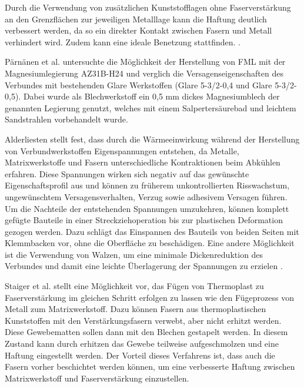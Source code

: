  

Durch die Verwendung von zusätzlichen Kunststofflagen ohne Faserverstärkung an den Grenzflächen zur jeweiligen Metalllage kann die Haftung deutlich verbessert werden, da so ein direkter Kontakt zwischen Fasern und Metall verhindert wird.
Zudem kann eine ideale Benetzung stattfinden. \cite{Marissen.1988}.



Pärnänen et al.\cite{Parnanen.2012} untersuchte die Möglichkeit der Herstellung von FML mit der Magnesiumlegierung AZ31B-H24 und verglich die Versagenseigenschaften des Verbundes mit bestehenden Glare Werkstoffen (Glare 5-3/2-0,4 und Glare 5-3/2-0,5).
Dabei wurde als Blechwerkstoff ein 0,5 mm dickes Magnesiumblech der genannten Legierung genutzt, welches mit einem Salpertersäurebad und leichtem Sandstrahlen vorbehandelt wurde.

Alderliesten \cite{Alderliesten.2009} stellt fest, dass durch die Wärmeeinwirkung während der Herstellung von Verbundwerkstoffen Eigenspannungen entstehen, da Metalle, Matrixwerkstoffe und Fasern unterschiedliche Kontraktionen beim Abkühlen erfahren.
Diese Spannungen wirken sich negativ auf das gewünschte Eigenschaftsprofil aus und können zu früherem unkontrollierten Risswachstum, ungewünschtem Versagensverhalten, Verzug sowie adhesivem Versagen führen.
Um die Nachteile der entstehenden Spannungen umzukehren, können komplett gefügte Bauteile in einer Streckziehoperation bis zur plastischen Deformation gezogen werden.
Dazu schlägt \cite{Delft.1} das Einspannen des Bauteils von beiden Seiten mit Klemmbacken vor, ohne die Oberfläche zu beschädigen.
Eine andere Möglichkeit ist die Verwendung von Walzen, um eine minimale Dickenreduktion des Verbundes und damit eine leichte Überlagerung der Spannungen zu erzielen \cite{Vogelesang.1989}.

Staiger et al. \cite{Staiger.2014} stellt eine Möglichkeit vor, das Fügen von Thermoplast zu Faserverstärkung im gleichen Schritt erfolgen zu lassen wie den Fügeprozess von Metall zum Matrixwerkstoff.
Dazu können Fasern aus thermoplastischen Kunststoffen mit den Verstärkungsfasern verwebt, aber nicht erhitzt werden.
Diese Gewebematten sollen dann mit den Blechen gestapelt werden.
In diesem Zustand kann durch erhitzen das Gewebe teilweise aufgeschmolzen und eine Haftung eingestellt werden.
Der Vorteil dieses Verfahrens ist, dass auch die Fasern vorher beschichtet werden können, um eine verbesserte Haftung zwischen Matrixwerkstoff und Faserverstärkung einzustellen.



